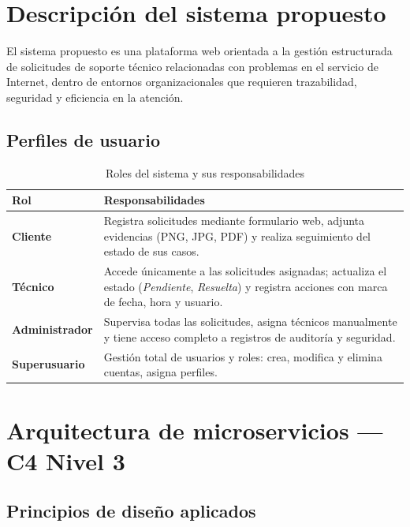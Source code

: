 \documentclass[12pt,a4paper]{article}
\begin{document}
\tableofcontents
\newpage


\section{Descripción del sistema propuesto}

El sistema propuesto es una plataforma web orientada a la gestión estructurada de
solicitudes de soporte técnico relacionadas con problemas en el servicio de Internet,
dentro de entornos organizacionales que requieren trazabilidad, seguridad y eficiencia
en la atención.

\subsection{Perfiles de usuario}

\begin{table}[H]
\centering
\caption{Roles del sistema y sus responsabilidades}
\begin{tabularx}{\textwidth}{lX}
\toprule
\textbf{Rol} & \textbf{Responsabilidades} \\
\midrule
\textbf{Cliente}
  & Registra solicitudes mediante formulario web, adjunta evidencias
    (PNG, JPG, PDF) y realiza seguimiento del estado de sus casos. \\
\textbf{Técnico}
  & Accede únicamente a las solicitudes asignadas; actualiza el estado
    (\emph{Pendiente}, \emph{Resuelta}) y registra acciones con marca
    de fecha, hora y usuario. \\
\textbf{Administrador}
  & Supervisa todas las solicitudes, asigna técnicos manualmente y
    tiene acceso completo a registros de auditoría y seguridad. \\
\textbf{Superusuario}
  & Gestión total de usuarios y roles: crea, modifica y elimina
    cuentas, asigna perfiles. \\
\bottomrule
\end{tabularx}
\end{table}

\section{Arquitectura de microservicios — C4 Nivel 3}

\subsection{Principios de diseño aplicados}
\end{document}
